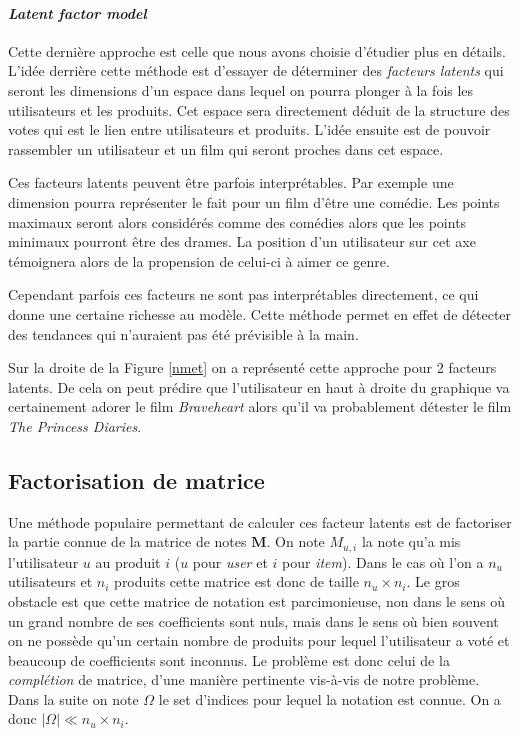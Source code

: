 \documentclass[10pt,a4paper]{article}
\begin{document}
\paragraph{\textit{Latent factor model}}

Cette dernière approche est celle que nous avons choisie d'étudier plus en détails. L'idée derrière cette méthode est d'essayer de déterminer des \textit{facteurs latents} qui seront les dimensions d'un espace dans lequel on pourra plonger à la fois les utilisateurs et les produits. Cet espace sera directement déduit de la structure des votes qui est le lien entre utilisateurs et produits. L'idée ensuite est de pouvoir rassembler un utilisateur et un film qui seront proches dans cet espace. 

Ces facteurs latents peuvent être parfois interprétables. Par exemple une dimension pourra représenter le fait pour un film d'être une comédie. Les points maximaux seront alors considérés comme des comédies alors que les points minimaux pourront être des drames. La position d'un utilisateur sur cet axe témoignera alors de la propension de celui-ci à aimer ce genre. 

Cependant parfois ces facteurs ne sont pas interprétables directement, ce qui donne une certaine richesse au modèle. Cette méthode permet en effet de détecter des tendances qui n'auraient pas été prévisible à la main.

Sur la droite de la Figure \ref{nmet} on a représenté cette approche pour 2 facteurs latents. De cela on peut prédire que l'utilisateur en haut à droite du graphique va certainement adorer le film \textit{Braveheart} alors qu'il va probablement détester le film \textit{The Princess Diaries}.

\subsection{Factorisation de matrice}

Une méthode populaire permettant de calculer ces facteur latents est de factoriser la partie connue de la matrice de notes $\textbf{M}$. On note $M_{u,i}$ la note qu'a mis l'utilisateur $u$ au produit $i$ ($u$ pour \textit{user} et $i$ pour \textit{item}). Dans le cas où l'on a $n_u$ utilisateurs et $n_i$ produits cette matrice est donc de taille $n_u\times n_i$. Le gros obstacle est que cette matrice de notation est parcimonieuse, non dans le sens où un grand nombre de ses coefficients sont nuls, mais dans le sens où bien souvent on ne possède qu'un certain nombre de produits pour lequel l'utilisateur a voté et beaucoup de coefficients sont inconnus. Le problème est donc celui de la \emph{complétion} de matrice, d'une manière pertinente vis-à-vis de notre problème. Dans la suite on note $\Omega$ le set d'indices pour lequel la notation est connue. On a donc $|\Omega|\ll n_u\times n_i$. 
\end{document}
